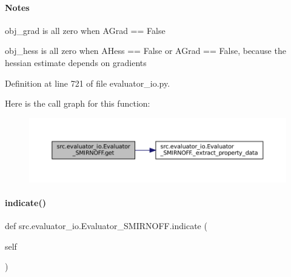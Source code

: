 \paragraph*{Notes }


\begin{DoxyEnumerate}
\item obj\+\_\+grad is all zero when A\+Grad == False
\item obj\+\_\+hess is all zero when A\+Hess == False or A\+Grad == False, because the hessian estimate depends on gradients 
\end{DoxyEnumerate}

Definition at line 721 of file evaluator\+\_\+io.\+py.

Here is the call graph for this function\+:
\nopagebreak
\begin{figure}[H]
\begin{center}
\leavevmode
\includegraphics[width=350pt]{classsrc_1_1evaluator__io_1_1Evaluator__SMIRNOFF_a609eeee4162c7b26fa40ff0df3eff104_cgraph}
\end{center}
\end{figure}
\mbox{\label{classsrc_1_1evaluator__io_1_1Evaluator__SMIRNOFF_ac09d0d592c217a77684c8a20e8ae8cef}} 
\paragraph{\texorpdfstring{indicate()}{indicate()}}
{\footnotesize\ttfamily def src.\+evaluator\+\_\+io.\+Evaluator\+\_\+\+S\+M\+I\+R\+N\+O\+F\+F.\+indicate (\begin{DoxyParamCaption}\item[{}]{self }\end{DoxyParamCaption})}




